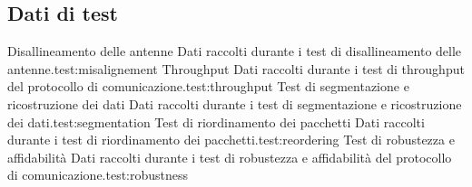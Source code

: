 \documentclass[12pt,a4paper,twoside]{book}
\begin{document}
\begin{appendices}
    \chapter{Dati di test} \label{app:test}
    \begin{enumerate}
        {Disallineamento delle antenne}%
        {Dati raccolti durante i test di disallineamento delle antenne.}{test:misalignement}
        {Throughput}%
        {Dati raccolti durante i test di throughput del protocollo di comunicazione.}{test:throughput}
        {Test di segmentazione e ricostruzione dei dati}%
        {Dati raccolti durante i test di segmentazione e ricostruzione dei dati.}{test:segmentation}
        {Test di riordinamento dei pacchetti}%
        {Dati raccolti durante i test di riordinamento dei pacchetti.}{test:reordering}
        {Test di robustezza e affidabilità}%
        {Dati raccolti durante i test di robustezza e affidabilità del protocollo di comunicazione.}{test:robustness}
    \end{enumerate}

\end{appendices}
\end{document}
